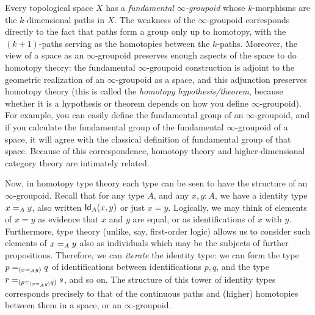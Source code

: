 Every topological space $X$ has a \emph{fundamental $\infty$-groupoid}
whose
$k$-mor\-ph\-isms are the $k$-dimen\-sional paths in $X$.  The weakness of the
$\infty$-group\-oid corresponds directly to the fact that paths form a
group only up to homotopy, with the $(k+1)$-paths serving as the
homotopies between the $k$-paths.  Moreover, the view of a space as an
$\infty$-groupoid preserves enough aspects of the space to do homotopy theory:
the fundamental $\infty$-groupoid construction is adjoint to the
geometric realization of an $\infty$-groupoid as a space, and this
adjunction preserves homotopy theory (this is called the \emph{homotopy
  hypothesis/theorem},
because whether it is a hypothesis or theorem
depends on how you define $\infty$-groupoid).  For example, you can
easily define the fundamental group of an $\infty$-groupoid, and if you
calculate the fundamental group of the fundamental $\infty$-groupoid of
a space, it will agree with the classical definition of fundamental
group of that space.  Because of this correspondence, homotopy theory
and higher-dimensional category theory are intimately related.

%
%

\mentalpause

Now, in homotopy type theory each type can be seen to have the structure
of an $\infty$-groupoid.  Recall that for any type $A$, and any $x,y:A$,
we have a identity type $\id[A]{x}{y}$, also written $\idtype[A]{x}{y}$
or just $x=y$.  Logically, we may think of elements of $x=y$ as evidence
that $x$ and $y$ are equal, or as identifications of $x$ with
$y$. Furthermore, type theory (unlike, say, first-order logic) allows us
to consider such elements of $\id[A]{x}{y}$ also as individuals which
may be the subjects of further propositions.  Therefore, we can
\emph{iterate} the identity type: we can form the type
$\id[{(\id[A]{x}{y})}]{p}{q}$ of identifications between
identifications $p,q$, and the type
$\id[{(\id[{(\id[A]{x}{y})}]{p}{q})}]{r}{s}$, and so on.  The structure
of this tower of identity types corresponds precisely to that of the
continuous paths and (higher) homotopies between them in a space, or an
$\infty$-groupoid.


